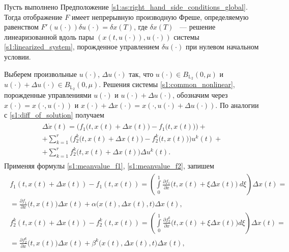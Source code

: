 \documentclass[../main.tex]{subfiles}
\begin{document}
\begin{lemma}\label{s1:lem:frechet_derivative_common}
 Пусть выполнено Предположение \ref{s1:as:right_hand_side_conditions_global}.
 Тогда отображение $F$ имеет непрерывную производную Фреше, определяемую равенством $ F'(u(\cdot))\delta u(\cdot) =\delta x(T)$, где $\delta x(T)$ ~--- решение линеаризованной вдоль пары $\left( x(t,u(\cdot)),u(\cdot)\right) $ системы \eqref{s1:linearized_system}, порожденное управлением $\delta u(\cdot)$ при нулевом начальном условии.
\end{lemma}
\doc 
Выберем произвольные $u(\cdot)$, $\Delta u(\cdot)$ так, что $ u(\cdot) \in B_{\mathbb{L}_2}(0,\mu)$ и $ u(\cdot) + \Delta u(\cdot) \in B_{\mathbb{L}_2}(0,\mu)$.
Решения системы \eqref{s1:common_nonlinear}, порожденные управлениями $u(\cdot)$ и $u(\cdot) + \Delta u(\cdot)$, обозначим через $x(\cdot) = x(\cdot,u(\cdot))$ и $ x(\cdot) + \Delta x(\cdot) = x(\cdot, u(\cdot) + \Delta u(\cdot))$.
По аналогии с \eqref{s1:diff_of_solution} получаем
\begin{gather}\label{s1:delta_x}
	\begin{gathered}
		\Delta \dot{x}(t) =
		\Big( f_1\big(t, x(t)+\Delta x(t)\big) - f_1\big(t, x(t)\big) \Big) + \\ +
		\sum\limits_{k=1}^r \Big( f_2^k\big(t, x(t)+\Delta x(t)\big) - f_2^k\big(t,x(t)\big) \Big) u^k(t) + \\ +
		\sum\limits_{k=1}^r f_2^k\big(t, x(t)+\Delta x(t)\big) \Delta u^k(t) .
	\end{gathered}
\end{gather}
Применяя формулы \eqref{s1:meanvalue_f1}, \eqref{s1:meanvalue_f2}, запишем 
\begin{gather*}
	\begin{gathered}
		 f_1(t, x(t)+\Delta x(t)) - f_1(t, x(t)) = \left( \int\limits_0^1 \frac{\partial f_1}{\partial x} \Big(t, x(t) + \xi \Delta x(t)\Big) \ d\xi \right) \Delta x(t) = \\ = \frac{\partial f_1}{\partial x} \Big(t, x(t)\Big) \Delta x(t) + \alpha\Big(x(t),\Delta x(t), t\Big) \Delta x(t), \\ 
		f_2^k(t, x(t)+\Delta x(t)) - f_2^k(t, x(t)) = \left( \int\limits_0^1 \frac{\partial f_2^k}{\partial x} \Big(t, x(t) + \xi \Delta x(t)\Big) d\xi \right) \Delta x(t) = \\
		= \frac{\partial f_2^k}{\partial x} \Big(t, x(t)\Big) \Delta x(t) + \beta^k\Big(x(t),\Delta x(t), t\Big) \Delta x(t),
	\end{gathered}
\end{gather*}
\end{document}
